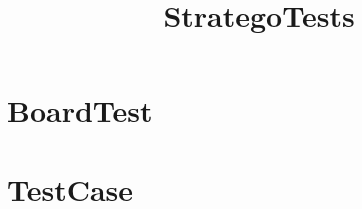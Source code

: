 \documentclass{article}
\begin{document}
\title{StrategoTests}
\author{}
\maketitle
\tableofcontents

\section{BoardTest}


\section{TestCase}

\end{document}
